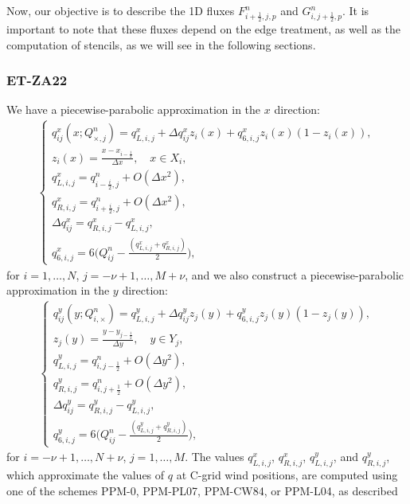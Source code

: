 Now, our objective is to describe the 1D fluxes ${F}_{i+\frac{1}{2},j,p}^n$ and ${G}_{i,j+\frac{1}{2},p}^n$. 
It is important to note that these fluxes depend on the edge treatment, as well as the computation of stencils, as we will see in the following sections.

\subsubsection{ET-ZA22}
We have a piecewise-parabolic approximation in the $x$ direction:
\begin{align}
	\label{chp5-ppmx-eq1}
	\begin{cases}
		q_{ij}^x(x;Q_{\times, j}^n) = q_{L,i,j}^x + \Delta q_{ij}^x z_i(x) + q_{6, i,j}^xz_i(x)(1-z_i(x)), \\
		z_i(x) = \frac{x-x_{i-\frac{1}{2}}}{\Delta x},
		\quad x \in X_i,\\
		q_{L, i,j}^x = q_{i-\frac{i}{2},j}^n+ O(\Delta x^2),\\
		q_{R, i,j}^x = q_{i+\frac{i}{2},j}^n+ O(\Delta x^2),\\
		\Delta q_{ij}^x = q_{R, i,j}^x - q_{L, i,j}^x,\\
		q_{6,i,j}^x = 6\bigg(Q_{ij}^n - \frac{(q_{L,i,j}^x + q_{R,i,j}^x)}{2}\bigg),
	\end{cases}
\end{align}
for $i=1, \ldots, N$, $j=-\nu+1, \ldots, M + \nu$, and we also construct a piecewise-parabolic
approximation in the $y$ direction:
\begin{align}
	\label{chp5-ppmy-eq2}
	\begin{cases}
		q_{ij}^y(y;Q_{i,\times}^n) = q_{L,i,j}^y + \Delta q_{ij}^y z_j(y) + q_{6, i,j}^yz_j(y)(1-z_j(y)),\\ 
		z_j(y) = \frac{y-y_{j-\frac{1}{2}}}{\Delta y},
		\quad y \in Y_j,\\
		q_{L, i,j}^y = q_{i,j-\frac{1}{2}}^n+ O(\Delta y^2),\\
		q_{R, i,j}^y = q_{i,j+\frac{1}{2}}^n+ O(\Delta y^2),\\
		\Delta q_{ij}^y = q_{R, i,j}^y - q_{L, i,j}^y,\\
		q_{6,i,j}^y = 6\bigg(Q_{ij}^n - \frac{(q_{L,i,j}^y + q_{R,i,j}^y)}{2}\bigg),
	\end{cases}
\end{align}
for $i=-\nu+1, \ldots, N + \nu$, $j=1, \ldots, M$.
The values $q_{L,i,j}^x$, $q_{R,i,j}^x$, $q_{L,i,j}^y$, and $q_{R,i,j}^y$,
which approximate the values of $q$ at C-grid wind positions, are computed
using one of the schemes PPM-0, PPM-PL07, PPM-CW84, or PPM-L04, as described
